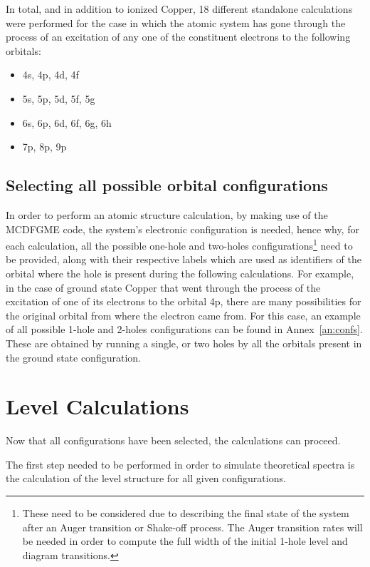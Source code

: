 In total, and in addition to ionized Copper, 18 different standalone calculations were performed for the case in which the atomic system has gone through the process of an excitation of any one of the constituent electrons to the following orbitals:

\begin{itemize}
    \item 4s, 4p, 4d, 4f
    \item 5s, 5p, 5d, 5f, 5g
    \item 6s, 6p, 6d, 6f, 6g, 6h
    \item 7p, 8p, 9p
\end{itemize}


\subsection{Selecting all possible orbital configurations}

In order to perform an atomic structure calculation, by making use of the \gls{MCDFGME} code, the system's electronic configuration is needed, hence why, for each calculation, all the possible one-hole and two-holes configurations\footnote{These need to be considered due to describing the final state of the system after an Auger transition or Shake-off process. The Auger transition rates will be needed in order to compute the full width of the initial 1-hole level and diagram transitions.} need to be provided, along with their respective labels which are used as identifiers of the orbital where the hole is present during the following calculations. For example, in the case of ground state Copper that went through the process of the excitation of one of its electrons to the orbital 4p, there are many possibilities for the original orbital from where the electron came from. For this case, an example of all possible 1-hole and 2-holes configurations can be found in Annex~\ref{an:confs}. These are obtained by running a single, or two holes by all the orbitals present in the ground state configuration.


\section{Level Calculations}
Now that all configurations have been selected, the calculations can proceed.

The first step needed to be performed in order to simulate theoretical spectra is the calculation of the level structure for all given configurations.

